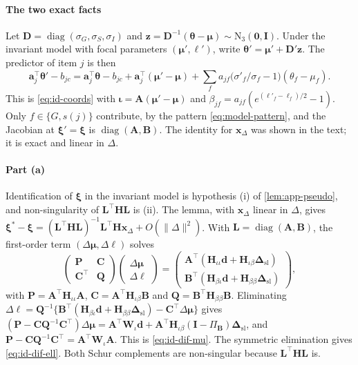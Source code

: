 \paragraph{The two exact facts}
Let $\bm D=\operatorname{diag}(\sigma_G,\sigma_S,\sigma_I)$ and $\bm z=\bm D^{-1}(\bm\theta-\bm\mu)\sim\mathrm N_3(\bm0,\bm I)$. Under the invariant model with focal parameters $(\bm\mu',\bm\ell')$, write $\bm\theta'=\bm\mu'+\bm D'\bm z$. The predictor of item $j$ is then
\[
  \bm a_j^\top\bm\theta'-b_{jc}=\bm a_j^\top\bm\theta-b_{jc}+\bm a_j^\top(\bm\mu'-\bm\mu)+\sum_f a_{jf}\bigl(\sigma'_f/\sigma_f-1\bigr)(\theta_f-\mu_f).
\]
This is \eqref{eq:id-coords} with $\bm\iota=\bm A(\bm\mu'-\bm\mu)$ and $\beta_{jf}=a_{jf}(e^{(\ell'_f-\ell_f)/2}-1)$. Only $f\in\{G,s(j)\}$ contribute, by the pattern \eqref{eq:model-pattern}, and the Jacobian at $\bm\xi'=\bm\xi$ is $\operatorname{diag}(\bm A,\bm B)$. The identity for $\bm x_\Delta$ was shown in the text; it is exact and linear in $\Delta$.

\paragraph{Part (a)}
Identification of $\bm\xi$ in the invariant model is hypothesis (i) of \cref{lem:app-pseudo}, and non-singularity of $\bm L^\top\bm H\bm L$ is (ii). The lemma, with $\bm x_\Delta$ linear in $\Delta$, gives $\bm\xi^*-\bm\xi=(\bm L^\top\bm H\bm L)^{-1}\bm L^\top\bm H\bm x_\Delta+O(\|\Delta\|^2)$. With $\bm L=\operatorname{diag}(\bm A,\bm B)$, the first-order term $(\Delta\bm\mu,\Delta\bm\ell)$ solves
\[
  \begin{pmatrix}\bm P&\bm C\\ \bm C^\top&\bm Q\end{pmatrix}\begin{pmatrix}\Delta\bm\mu\\ \Delta\bm\ell\end{pmatrix}
  =\begin{pmatrix}\bm A^\top(\bm H_{\iota\iota}\bm d+\bm H_{\iota\beta}\bm\Delta_{\mathrm{sl}})\\ \bm B^\top(\bm H_{\beta\iota}\bm d+\bm H_{\beta\beta}\bm\Delta_{\mathrm{sl}})\end{pmatrix},
\]
with $\bm P=\bm A^\top\bm H_{\iota\iota}\bm A$, $\bm C=\bm A^\top\bm H_{\iota\beta}\bm B$ and $\bm Q=\bm B^\top\bm H_{\beta\beta}\bm B$. Eliminating $\Delta\bm\ell=\bm Q^{-1}\{\bm B^\top(\bm H_{\beta\iota}\bm d+\bm H_{\beta\beta}\bm\Delta_{\mathrm{sl}})-\bm C^\top\Delta\bm\mu\}$ gives $(\bm P-\bm C\bm Q^{-1}\bm C^\top)\Delta\bm\mu=\bm A^\top\bm W_\iota\bm d+\bm A^\top\bm H_{\iota\beta}(\bm I-\Pi_{\bm B})\bm\Delta_{\mathrm{sl}}$, and $\bm P-\bm C\bm Q^{-1}\bm C^\top=\bm A^\top\bm W_\iota\bm A$. This is \eqref{eq:id-dif-mu}. The symmetric elimination gives \eqref{eq:id-dif-ell}. Both Schur complements are non-singular because $\bm L^\top\bm H\bm L$ is.

